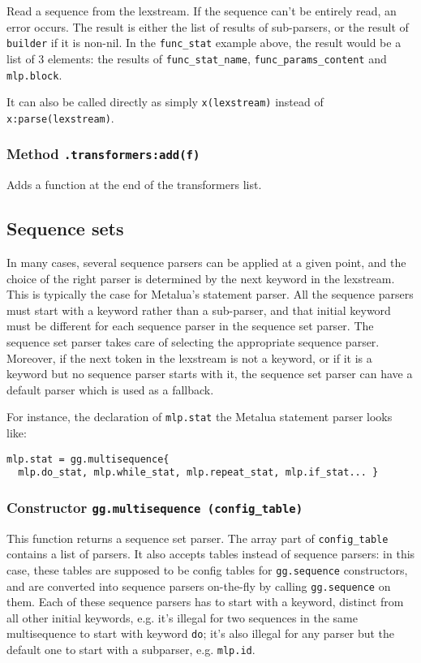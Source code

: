 Read a sequence from the lexstream. If the sequence can't be entirely
read, an error occurs. The result is either the list of results of
sub-parsers, or the result of \verb|builder| if it is non-nil. In the
\verb|func_stat| example above, the result would be a list of 3
elements: the results of \verb|func_stat_name|,
\verb|func_params_content| and \verb|mlp.block|.

It can also be called directly as simply \verb|x(lexstream)| instead of
\verb|x:parse(lexstream)|.

\subsubsection{Method {\tt .transformers:add(f)}}
Adds a function at the end of the transformers list.

\subsection{Sequence sets}

In many cases, several sequence parsers can be applied at a given
point, and the choice of the right parser is determined by the next
keyword in the lexstream. This is typically the case for Metalua's
statement parser. All the sequence parsers must start with a keyword
rather than a sub-parser, and that initial keyword must be different
for each sequence parser in the sequence set parser. The sequence set
parser takes care of selecting the appropriate sequence
parser. Moreover, if the next token in the lexstream is not a keyword, or
if it is a keyword but no sequence parser starts with it, the sequence
set parser can have a default parser which is used as a fallback.

For instance, the declaration of \verb|mlp.stat| the Metalua statement
parser looks like:

\begin{verbatim}
mlp.stat = gg.multisequence{
  mlp.do_stat, mlp.while_stat, mlp.repeat_stat, mlp.if_stat... }
\end{verbatim}

\subsubsection{Constructor {\tt gg.multisequence (config\_table)}}


This function returns a sequence set parser. The array part of
\verb|config_table| contains a list of parsers. It also accepts tables
instead of sequence parsers: in this case, these tables are supposed
to be config tables for \verb|gg.sequence| constructors, and are
converted into sequence parsers on-the-fly by calling
\verb|gg.sequence| on them. Each of these sequence parsers has to
start with a keyword, distinct from all other initial keywords,
e.g. it's illegal for two sequences in the same multisequence to start
with keyword {\tt do}; it's also illegal for any parser but the
default one to start with a subparser, e.g. {\tt mlp.id}.

